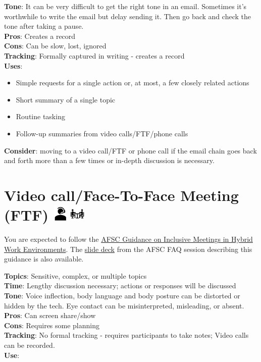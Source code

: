\documentclass[
  letterpaper,
  DIV=11,
  numbers=noendperiod]{scrreprt}
\providecommand{\tightlist}{%
  \setlength{\itemsep}{0pt}\setlength{\parskip}{0pt}}\usepackage{longtable,booktabs,array}
\begin{document}
\textbf{Tone}: It can be very difficult to get the right tone in an
email. Sometimes it's worthwhile to write the email but delay sending
it. Then go back and check the tone after taking a pause.\\
\textbf{Pros}: Creates a record\\
\textbf{Cons}: Can be slow, lost, ignored\\
\textbf{Tracking}: Formally captured in writing - creates a record\\
\textbf{Uses}:

\begin{itemize}
\tightlist
\item
  Simple requests for a single action or, at most, a few closely related
  actions\\
\item
  Short summary of a single topic\\
\item
  Routine tasking\\
\item
  Follow-up summaries from video calls/FTF/phone calls
\end{itemize}

\textbf{Consider}: moving to a video call/FTF or phone call if the email
chain goes back and forth more than a few times or in-depth discussion
is necessary.

\section[Video call/Face-To-Face Meeting (FTF) ]{\texorpdfstring{Video
call/Face-To-Face Meeting (FTF)
\protect\includegraphics[width=\textwidth,height=0.3125in]{_img/FTF_Vchat_icon.png}}{Video call/Face-To-Face Meeting (FTF) }}\label{video-callface-to-face-meeting-ftf}

You are expected to follow the
\href{https://docs.google.com/document/d/1K8mBHH6JOdKC4aT0L4jHmTJot9n4fnW9_L9kwdclCkQ/edit\#heading=h.wwlwg0rdx3c8}{AFSC
Guidance on Inclusive Meetings in Hybrid Work Environments}. The
\href{https://docs.google.com/presentation/d/1D9cA_HwDdASXM5VfEV4l6n8_h7GG4ieXiAD4a9Lo0jo/edit\#slide=id.p}{slide
deck} from the AFSC FAQ session describing this guidance is also
available.

\textbf{Topics}: Sensitive, complex, or multiple topics\\
\textbf{Time}: Lengthy discussion necessary; actions or responses will
be discussed\\
\textbf{Tone}: Voice inflection, body language and body posture can be
distorted or hidden by the tech. Eye contact can be misinterpreted,
misleading, or absent.\\
\textbf{Pros}: Can screen share/show\\
\textbf{Cons}: Requires some planning\\
\textbf{Tracking}: No formal tracking - requires participants to take
notes; Video calls can be recorded.\\
\textbf{Use}:
\end{document}
